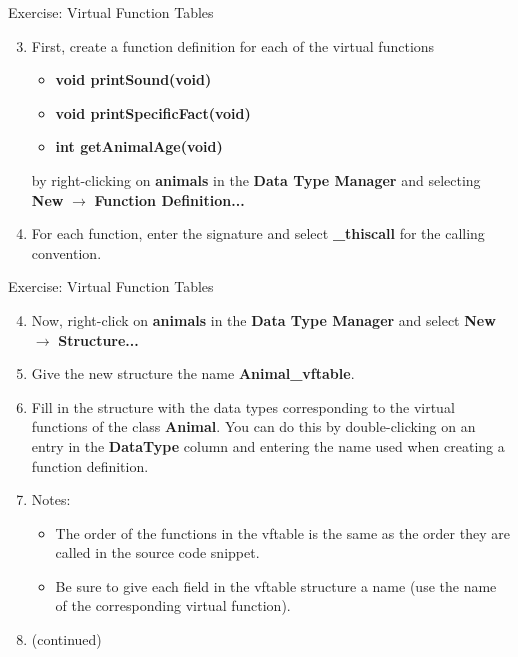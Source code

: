 \documentclass{beamer}
\begin{document}
\begin{frame}
\begin{block}{Exercise: Virtual Function Tables}
\begin{enumerate}
\setcounter{enumi}{2}
\item First, create a function definition for each of the virtual functions 
\begin{itemize}
\item \textbf{void printSound(void)}
\item \textbf{void printSpecificFact(void)}
\item \textbf{int getAnimalAge(void)}
\end{itemize}
by right-clicking on \textbf{animals} in the \textbf{Data Type Manager} and selecting \textbf{New} $\rightarrow$ \textbf{Function Definition...} 
\item[] For each function, enter the signature and select \textbf{\_thiscall} for the calling convention. 
\end{enumerate}
\end{block}
\end{frame}

\begin{frame}
\begin{block}{Exercise: Virtual Function Tables}
\begin{enumerate}
\setcounter{enumi}{3}
\item Now, right-click on \textbf{animals} in the \textbf{Data Type Manager} and select \textbf{New} $\rightarrow$ \textbf{Structure...}
\item Give the new structure the name \textbf{Animal\_vftable}.
\item Fill in the structure with the data types corresponding to the virtual functions of the class \textbf{Animal}.  You can do this by double-clicking 
on an entry in the \textbf{DataType} column and entering the name used when creating a function definition.  
\item[] Notes:
\begin{itemize}
\item The order of the functions in the vftable is the same as the order they are called in the source code snippet.
\item Be sure to give each field in the vftable structure a name (use the name of the corresponding virtual function).
\end{itemize}
\item[] (continued)
\end{enumerate}
\end{block}
\end{frame}
\end{document}
